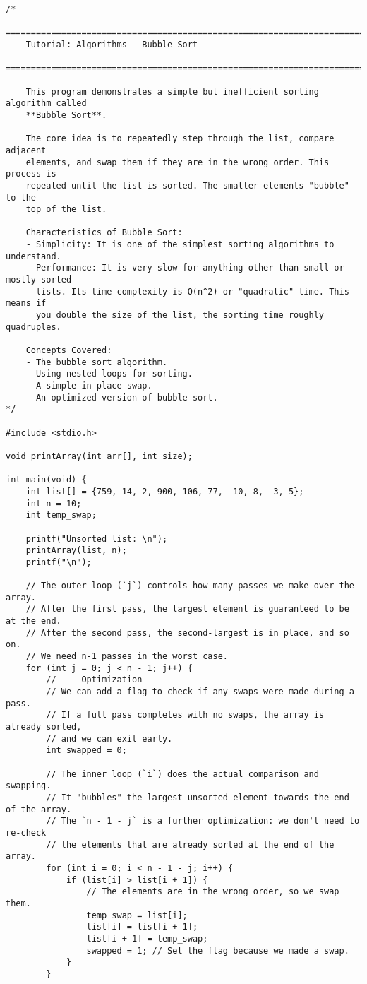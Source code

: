 \documentclass[11pt]{book}
\begin{document}
\begin{verbatim}
/*
    ================================================================================
    Tutorial: Algorithms - Bubble Sort
    ================================================================================

    This program demonstrates a simple but inefficient sorting algorithm called
    **Bubble Sort**.

    The core idea is to repeatedly step through the list, compare adjacent
    elements, and swap them if they are in the wrong order. This process is
    repeated until the list is sorted. The smaller elements "bubble" to the
    top of the list.

    Characteristics of Bubble Sort:
    - Simplicity: It is one of the simplest sorting algorithms to understand.
    - Performance: It is very slow for anything other than small or mostly-sorted
      lists. Its time complexity is O(n^2) or "quadratic" time. This means if
      you double the size of the list, the sorting time roughly quadruples.

    Concepts Covered:
    - The bubble sort algorithm.
    - Using nested loops for sorting.
    - A simple in-place swap.
    - An optimized version of bubble sort.
*/

#include <stdio.h>

void printArray(int arr[], int size);

int main(void) {
    int list[] = {759, 14, 2, 900, 106, 77, -10, 8, -3, 5};
    int n = 10;
    int temp_swap;

    printf("Unsorted list: \n");
    printArray(list, n);
    printf("\n");

    // The outer loop (`j`) controls how many passes we make over the array.
    // After the first pass, the largest element is guaranteed to be at the end.
    // After the second pass, the second-largest is in place, and so on.
    // We need n-1 passes in the worst case.
    for (int j = 0; j < n - 1; j++) {
        // --- Optimization ---
        // We can add a flag to check if any swaps were made during a pass.
        // If a full pass completes with no swaps, the array is already sorted,
        // and we can exit early.
        int swapped = 0;

        // The inner loop (`i`) does the actual comparison and swapping.
        // It "bubbles" the largest unsorted element towards the end of the array.
        // The `n - 1 - j` is a further optimization: we don't need to re-check
        // the elements that are already sorted at the end of the array.
        for (int i = 0; i < n - 1 - j; i++) {
            if (list[i] > list[i + 1]) {
                // The elements are in the wrong order, so we swap them.
                temp_swap = list[i];
                list[i] = list[i + 1];
                list[i + 1] = temp_swap;
                swapped = 1; // Set the flag because we made a swap.
            }
        }


\end{verbatim}
\end{document}

